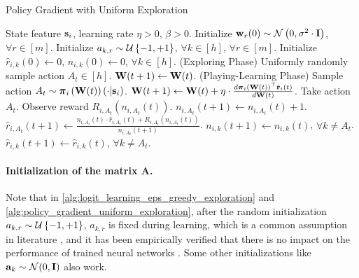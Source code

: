 \begin{algorithm}[t]
   \caption{Policy Gradient with Uniform Exploration}
\label{alg:policy_gradient_uniform_exploration}
\begin{algorithmic}
    State feature ${\mathbf{s}}_i$, learning rate $\eta > 0$, $\beta > 0$.
   \STATE Initialize ${\mathbf{w}}_r(0) \sim {\mathcal{N}}\left( 0, \sigma^2 \cdot {\mathbf{I}} \right)$, $\forall r \in [m]$. \STATE Initialize $a_{k, r} \sim {\mathcal{U}}\left\{-1, +1\right\}$, $\forall k \in [h]$, $\forall r \in [m]$.
   \STATE Initialize $\hat{r}_{i,k}\left(0\right) \gets 0$, $n_{i,k}\left(0\right) \gets 0$, $\forall k \in [h]$.
   \STATE (Exploring Phase)
   \STATE Uniformly randomly sample action $A_{t} \in [h]$.
   \STATE ${\mathbf{W}}(t+1) \leftarrow {\mathbf{W}}(t)$.
   \ELSE
   \STATE (Playing-Learning Phase)
   \STATE Sample action $A_{t} \sim {\boldsymbol{\pi}}_{i}\left({\mathbf{W}}(t)\right)\left(\cdot \middle| {\mathbf{s}}_i \right)$.
   \STATE ${\mathbf{W}}(t+1) \leftarrow {\mathbf{W}}(t) + \eta \cdot \frac{d {\boldsymbol{\pi}}_{i}\left({\mathbf{W}}(t)\right)^\top \hat{{\mathbf{r}}}_i \left(t\right)}{d {\mathbf{W}}(t)}$.
   \ENDIF
   \STATE Take action $A_{t}$. Observe reward $R_{i, A_{t}}\left(n_{i, A_{t}}\left(t\right) \right)$.
   \STATE $n_{i, A_{t}}\left(t+1\right) \gets n_{i, A_{t}}\left(t\right) + 1$.
   \STATE $\hat{r}_{i,A_{t}}\left(t+1\right) \gets \frac{n_{i, A_{t}}\left(t\right) \cdot \hat{r}_{i,A_{t}}\left(t\right) + R_{i, A_{t}}\left(n_{i, A_{t}}\left(t\right)\right) }{n_{i, A_{t}}\left(t+1\right)}$.
   \STATE $n_{i, k}\left(t+1\right) \gets n_{i, k}\left(t\right)$, $\forall k \not= A_t$.
   \STATE $\hat{r}_{i,k}\left(t+1\right) \gets \hat{r}_{i,k}\left(t\right)$, $\forall k \not= A_t$.
   \ENDFOR
\end{algorithmic}
\end{algorithm}

\paragraph{Initialization of the matrix $\mathbf{A}$.} Note that in \cref{alg:logit_learning_eps_greedy_exploration} and \cref{alg:policy_gradient_uniform_exploration}, after the random initialization $a_{k,r} \sim {\mathcal{U}}\left\{-1, +1\right\}$, $a_{k,r}$ is fixed during learning, which is a common assumption in literature \citep{li2018learning,du2018gradientA,du2018gradientB,allen2018convergenceA,allen2018convergenceB}, and it has been empirically verified that there is no impact on the performance of trained neural networks \citep{hoffer2018fix}. Some other initializations like ${\mathbf{a}}_k \sim {\mathcal{N}}(0, {\mathbf{I}})$ also work.
